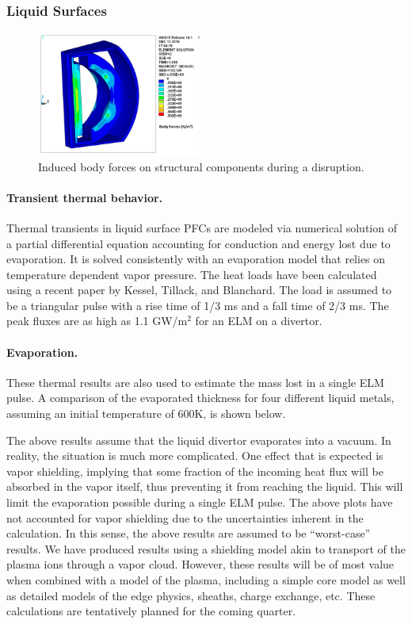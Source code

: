 \subsubsection{Liquid Surfaces}

\begin{figure}
\centering
\includegraphics[width=0.48\textwidth]{imgs/disrupt-em.png}
\caption{\label{fig:disrupt-em}Induced body forces on structural components during a disruption.}
\end{figure}

\paragraph{Transient thermal behavior.} Thermal transients in liquid surface
\glspl{PFC} are modeled via numerical solution of a partial differential
equation accounting for conduction and energy lost due to evaporation. It is
solved consistently with an evaporation model that relies on temperature
dependent vapor pressure. The heat loads have been calculated using a recent
paper by Kessel, Tillack, and Blanchard. The load is assumed to be a
triangular pulse with a rise time of 1/3 ms and a fall time of 2/3 ms. The peak
fluxes are as high as 1.1 GW/m$^2$ for an \gls{ELM} on a divertor.

\paragraph{Evaporation.} These thermal results are also used to estimate
the mass lost in a single \gls{ELM} pulse. A comparison of the evaporated thickness
for four different liquid metals, assuming an initial temperature of 600K, is
shown below.

The above results assume that the liquid divertor evaporates into a vacuum. In
reality, the situation is much more complicated. One effect that is expected
is vapor shielding, implying that some fraction of the incoming heat flux will
be absorbed in the vapor itself, thus preventing it from reaching the
liquid. This will limit the evaporation possible during a single \gls{ELM}
pulse. The above plots have not accounted for vapor shielding due to the
uncertainties inherent in the calculation. In this sense, the above results
are assumed to be “worst-case” results. We have produced results using a
shielding model akin to transport of the plasma ions through a vapor
cloud. However, these results will be of most value when combined with a model
of the plasma, including a simple core model as well as detailed models of the
edge physics, sheaths, charge exchange, etc. These calculations are
tentatively planned for the coming quarter.

